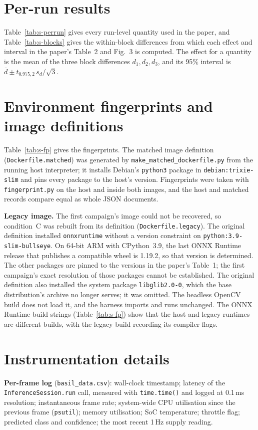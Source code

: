 \documentclass[10pt]{article}
\begin{document}
\section{Per-run results}
Table~\ref{tab:s-perrun} gives every run-level quantity used in the paper, and Table~\ref{tab:s-blocks} gives the within-block differences from which each effect and interval in the paper's Table~2 and Fig.~3 is computed. The effect for a quantity is the mean of the three block differences $d_1,d_2,d_3$, and its 95\% interval is $\bar d \pm t_{0.975,2}\, s_d/\sqrt3$.

\section{Environment fingerprints and image definitions}
Table~\ref{tab:s-fp} gives the fingerprints. The matched image definition (\texttt{Dockerfile.matched}) was generated by \texttt{make\_matched\_dockerfile.py} from the running host interpreter; it installs Debian's \texttt{python3} package in \texttt{debian:trixie-slim} and pins every package to the host's version. Fingerprints were taken with \texttt{fingerprint.py} on the host and inside both images, and the host and matched records compare equal as whole JSON documents.

\textbf{Legacy image.} The first campaign's image could not be recovered, so condition~C was rebuilt from its definition (\texttt{Dockerfile.legacy}). The original definition installed \texttt{onnxruntime} without a version constraint on \texttt{python:3.9-slim-bullseye}. On 64-bit ARM with CPython~3.9, the last ONNX Runtime release that publishes a compatible wheel is 1.19.2, so that version is determined. The other packages are pinned to the versions in the paper's Table~1; the first campaign's exact resolution of those packages cannot be established. The original definition also installed the system package \texttt{libglib2.0-0}, which the base distribution's archive no longer serves; it was omitted. The headless OpenCV build does not load it, and the harness imports and runs unchanged. The ONNX Runtime build strings (Table~\ref{tab:s-fp}) show that the host and legacy runtimes are different builds, with the legacy build recording its compiler flags.

\section{Instrumentation details}
\textbf{Per-frame log} (\texttt{basil\_data.csv}): wall-clock timestamp; latency of the \texttt{InferenceSession.run} call, measured with \texttt{time.time()} and logged at 0.1\,ms resolution; instantaneous frame rate; system-wide CPU utilisation since the previous frame (\texttt{psutil}); memory utilisation; SoC temperature; throttle flag; predicted class and confidence; the most recent 1\,Hz supply reading.
\end{document}
